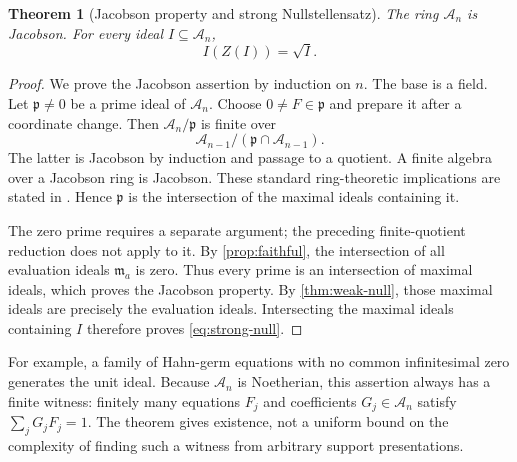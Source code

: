 \documentclass[11pt,letterpaper]{article}
\newtheorem{theorem}{Theorem}[section]
\theoremstyle{definition}
\theoremstyle{remark}
\newcommand{\A}{\mathscr A}
\newcommand{\m}{\mathfrak m}
\numberwithin{equation}{section}
\begin{document}
\begin{theorem}[Jacobson property and strong Nullstellensatz]\label{thm:strong-null}
The ring $\A_n$ is Jacobson. For every ideal $I\subseteq\A_n$,
\begin{equation}\label{eq:strong-null}
 I(Z(I))=\sqrt I.
\end{equation}
\end{theorem}
\begin{proof}
We prove the Jacobson assertion by induction on $n$. The base is a field. Let $\mathfrak p\ne0$ be a prime ideal of $\A_n$. Choose $0\ne F\in\mathfrak p$ and prepare it after a coordinate change. Then $\A_n/\mathfrak p$ is finite over
\[
 \A_{n-1}/(\mathfrak p\cap\A_{n-1}).
\]
The latter is Jacobson by induction and passage to a quotient. A finite algebra over a Jacobson ring is Jacobson. These standard ring-theoretic implications are stated in \cite[\S10.35]{Stacks}. Hence $\mathfrak p$ is the intersection of the maximal ideals containing it.

The zero prime requires a separate argument; the preceding finite-quotient reduction does not apply to it. By \cref{prop:faithful}, the intersection of all evaluation ideals $\m_a$ is zero. Thus every prime is an intersection of maximal ideals, which proves the Jacobson property. By \cref{thm:weak-null}, those maximal ideals are precisely the evaluation ideals. Intersecting the maximal ideals containing $I$ therefore proves \eqref{eq:strong-null}.
\end{proof}

For example, a family of Hahn-germ equations with no common infinitesimal zero generates the unit ideal. Because $\A_n$ is Noetherian, this assertion always has a finite witness: finitely many equations $F_j$ and coefficients $G_j\in\A_n$ satisfy $\sum_jG_jF_j=1$. The theorem gives existence, not a uniform bound on the complexity of finding such a witness from arbitrary support presentations.
\end{document}
